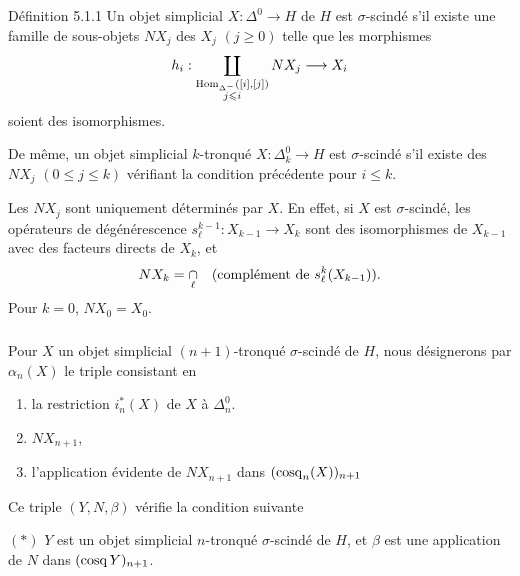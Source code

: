 \documentclass[10pt]{../fichiers-configuration-latex/smfart}
\begin{document}
\begin{enonce*}{Définition 5.1.1}
Un objet simplicial $X : \Delta^0 \to H$ de $H$ est $\sigma$-scindé
s'il existe une famille de sous-objets $NX_j$ des $X_j$ $(j \geq 0)$
telle que les morphismes
$$
h_i:\coprod_{\substack{\operatorname{Hom}_{\Delta^{-}}([i], [j])\\
j\leqslant i}} NX_j \longrightarrow X_i
$$
soient des isomorphismes.
\end{enonce*}

De même, un objet simplicial $k$-tronqué $X : \Delta^0_k \to H$ est
$\sigma$-scindé s'il existe des $NX_j$ $(0 \leq j \leq k)$ vérifiant la
condition précédente pour $i \leq k$.

Les $NX_j$ sont uniquement déterminés par $X$. En effet, si $X$ est
$\sigma$-scindé, les opérateurs de dégénérescence $s^{k-1}_\ell :
X_{k-1} \to X_k$ sont des isomorphismes de $X_{k-1}$ avec des facteurs
directs de $X_k$, et
$$
NX_k = \mathop{\cap}_\ell\quad (\text{complément de } s^k_\ell(X_{k-1})){}.
$$
Pour $k = 0$, $NX_0 = X_0$.

\setcounter{subsubsection}{1}
\subsubsection{}
Pour $X$ un objet simplicial $(n+1)$-tronqué $\sigma$-scindé de $H$,
nous désignerons par $\alpha_n(X)$ le triple consistant en
\begin{enumerate}
\renewcommand{\theenumi}{\alph {enumi}}
\renewcommand{\labelenumi}{\theenumi)}
\item la restriction $i^{\ast}_n(X)$ de $X$ à $\Delta^0_n$.

\item $NX_{n+1}$,\pageoriginale

\item l'application évidente de $NX_{n+1}$ dans $(\operatorname{cosq}_n (X))_{n + 1}$
\end{enumerate}

Ce triple $(Y, N, \beta)$ vérifie la condition suivante

\noindent
$(\ast)$ $Y$ est un objet simplicial $n$-tronqué $\sigma$-scindé de $H$, et $\beta$ est
une application de $N$ dans $(\operatorname{cosq} Y)_{n+1}$.
\end{document}
